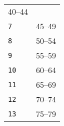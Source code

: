 \documentclass[]{article}
\begin{document}
\begin{longtable}[c]{@{}ll@{}}
\begin{minipage}[t]{0.69\columnwidth}
40--44
\end{minipage}
\\\addlinespace
\begin{minipage}[t]{0.24\columnwidth}\raggedright
\texttt{7}
\end{minipage} & \begin{minipage}[t]{0.69\columnwidth}\raggedright
45--49
\end{minipage}
\\\addlinespace
\begin{minipage}[t]{0.24\columnwidth}\raggedright
\texttt{8}
\end{minipage} & \begin{minipage}[t]{0.69\columnwidth}\raggedright
50--54
\end{minipage}
\\\addlinespace
\begin{minipage}[t]{0.24\columnwidth}\raggedright
\texttt{9}
\end{minipage} & \begin{minipage}[t]{0.69\columnwidth}\raggedright
55--59
\end{minipage}
\\\addlinespace
\begin{minipage}[t]{0.24\columnwidth}\raggedright
\texttt{10}
\end{minipage} & \begin{minipage}[t]{0.69\columnwidth}\raggedright
60--64
\end{minipage}
\\\addlinespace
\begin{minipage}[t]{0.24\columnwidth}\raggedright
\texttt{11}
\end{minipage} & \begin{minipage}[t]{0.69\columnwidth}\raggedright
65--69
\end{minipage}
\\\addlinespace
\begin{minipage}[t]{0.24\columnwidth}\raggedright
\texttt{12}
\end{minipage} & \begin{minipage}[t]{0.69\columnwidth}\raggedright
70--74
\end{minipage}
\\\addlinespace
\begin{minipage}[t]{0.24\columnwidth}\raggedright
\texttt{13}
\end{minipage} & \begin{minipage}[t]{0.69\columnwidth}\raggedright
75--79
\end{minipage}

\end{longtable}
\end{document}
